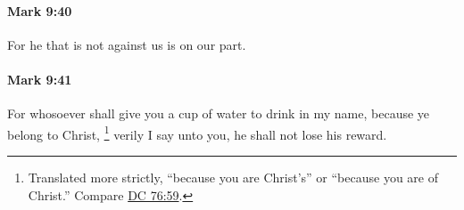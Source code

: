 		\paragraph{Mark 9:40} %
			\label{MARK-9-40}

			For he that is not against us is on our part.

			\begin{framed}
			\scriptsize
				\begin{compactdesc}
					\item[SBLG] 
				\end{compactdesc}
			\end{framed}

		\paragraph{Mark 9:41} %
			\label{MARK-9-41}

			For whosoever shall give you a cup of water to drink in my name, because ye belong to Christ,%
				\footnote{%
					Translated more strictly, ``because you are Christ's'' or ``because you are of Christ.'' Compare \hyperref[DC76-59]{DC 76:59}.
					}
			verily I say unto you, he shall not lose his reward.

